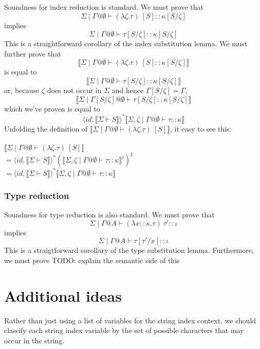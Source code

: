 \documentclass{article}
\newcommand{\sem}[1]{\llbracket #1 \rrbracket}
\begin{document}
Soundness for index reduction is standard. We must prove that $$\Sigma \mid \Gamma @ \emptyset \vdash (\lambda \zeta.\tau)~[S] :: \kappa[S/\zeta]$$ implies $$\Sigma \mid \Gamma @ \emptyset \vdash \tau[S/\zeta] :: \kappa[S/\zeta]$$ This is a straightforward corollary of the index substitution lemma.
We must further prove that $$\sem{\Sigma \mid \Gamma @ \emptyset \vdash (\lambda \zeta.\tau)~[S] :: \kappa[S/\zeta]}$$
is equal to $$\sem{\Sigma \mid \Gamma @ \emptyset \vdash \tau[S/\zeta] :: \kappa[S/\zeta]}$$ or, because $\zeta$ does not occur in $\Sigma$ and hence $\Gamma[S/\zeta] = \Gamma$, $$\sem{\Sigma \mid \Gamma[S/\zeta] @ \emptyset \vdash \tau[S/\zeta] :: \kappa[S/\zeta]}$$ which we've proven is equal to $$\langle \mathit{id}, \sem{\Sigma \vdash S} \rangle^* \sem{\Sigma,\zeta \mid \Gamma @ \emptyset \vdash \tau :: \kappa}$$
Unfolding the definition of $\sem{\Sigma \mid \Gamma @ \emptyset \vdash (\lambda \zeta. \tau)~[S]}$, it easy to see this:\\~\\
$\sem{\Sigma \mid \Gamma @ \emptyset \vdash (\lambda \zeta. \tau)~[S]}$\\
$= \langle \mathit{id}, \sem{\Sigma \vdash S} \rangle^* (\sem{\Sigma,\zeta \mid \Gamma @ \emptyset \vdash \tau :: \kappa}^\flat)^\sharp$\\
$= \langle \mathit{id}, \sem{\Sigma \vdash S} \rangle^* \sem{\Sigma,\zeta \mid \Gamma @ \emptyset \vdash \tau :: \kappa}$ 

\subsubsection*{Type reduction}

Soundness for type reduction is also standard. We must prove that $$\Sigma \mid \Gamma @ A \vdash (\lambda x :: \kappa. \tau)~\tau' :: \iota$$ implies $$\Sigma \mid \Gamma @ A \vdash \tau[\tau'/x] :: \iota$$ This is a straigtforward corollary of the type substitution lemma. Furthermore, we must prove
TODO: explain the semantic side of this

\section*{Additional ideas}

Rather than just using a list of variables for the string index context, we should classify each
string index variable by the set of possible characters that may occur in the string. 
 
\end{document}
